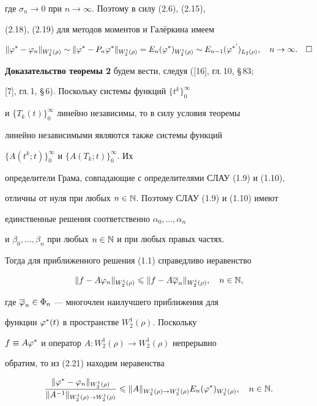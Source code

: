 где $\sigma_n\to 0$ при $n\to \infty$. Поэтому в силу (2.6), (2.15),


(2.18), (2.19) для методов моментов и Гал\"еркина имеем


\begin{equation}


\|\vp^* - \vp_n\|_{W_2^1(\rho)} \sim \|\vp^* - P_n\vp^*\|_{W_2^1(\rho)} =


E_n(\vp^*)_{W_2^1(\rho)}\sim


E_{n-1}(\vp^{*'})_{L_2(\rho)},\quad n\to \infty.\quad\square


\end{equation}





{\bf Доказательство теоремы 2} будем вести, следуя ([16], гл.\,10, \S\,83;


[7], гл.\,1, \S\,6). Поскольку системы функций $\{t^k\}_0^\infty$


и $\{T_k(t)\}_0^\infty$ линейно независимы, то в силу условия теоремы 


линейно независимыми являются также системы функций


$\{A(t^k;t)\}_0^\infty$ и $\{A(T_k;t)\}_0^\infty$. Их 


определители Грама, совпадающие с определителями СЛАУ (1.9) и (1.10), 


отличны от нуля при любых $n\in \Bbb N$. Поэтому СЛАУ (1.9) и (1.10) имеют 


единственные решения соответственно $\alpha_0,\dotsc, \alpha_n$


и $\beta_0,\dotsc,\beta_n$ при любых $n\in \Bbb N$ и при любых правых частях. 


Тогда для приближенного решения (1.1) справедливо неравенство


\begin{equation}


\|f-A\vp_n\|_{W_2^1(\rho)}\lea \|f-A\ol{\vp}_n\|_{W_2^1(\rho)},\quad n\in\N,


\end{equation}


где $\overline{\varphi}_n\in \Phi_n$ --- многочлен наилучшего приближения для 


функции $\varphi^*(t)$  в пространстве $W_2^1(\rho)$. Поскольку


$f\equiv A\varphi^*$ и оператор $A:W_2^1(\rho)\to W_2^1(\rho)$ непрерывно 


обратим, то из (2.21) находим неравенства


\begin{equation}


\frac{\|\vp^* - \vp_n\|_{W_2^1(\rho)}}{\|A^{-1}\|_{W_2^1(\rho)\to


W_2^1(\rho)}}\lea \|A\|_{W_2^1(\rho)\to W_2^1(\rho)}


E_n(\vp^*)_{W_2^1(\rho)},\quad n\in \N.


\end{equation}


